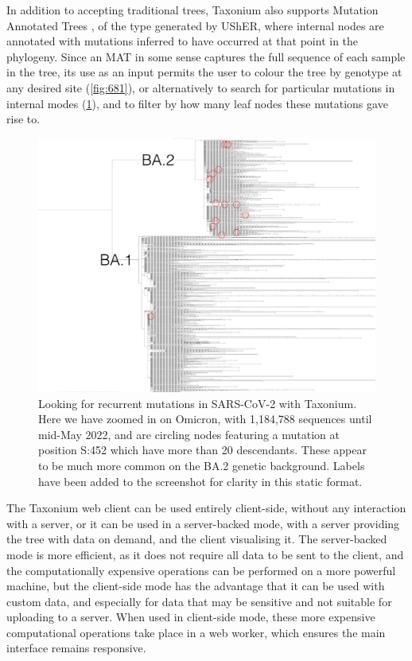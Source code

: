 In addition to accepting traditional trees, Taxonium also supports Mutation Annotated Trees \citep{matutils}, of the type generated by UShER, where internal nodes are annotated with mutations inferred to have occurred at that point in the phylogeny. Since an MAT in some sense captures the full sequence of each sample in the tree, its use as an input permits the user to colour the tree by genotype at any desired site (\cref{fig:681}), or alternatively to search for particular mutations in internal modes (\cref{fig:452}), and to filter by how many leaf nodes these mutations gave rise to.



\begin{figure}
\begin{center}
\includegraphics[width=\linewidth]{Figures/452.pdf}
\end{center}
\caption{Looking for recurrent mutations in SARS-CoV-2 with Taxonium. Here we have zoomed in on Omicron, with 1,184,788 sequences until mid-May 2022, and are circling nodes featuring a mutation at position S:452 which have more than 20 descendants. These appear to be much more common on the BA.2 genetic background. Labels have been added to the screenshot for clarity in this static format.}
\label{fig:452}
\end{figure}


The Taxonium web client can be used entirely client-side, without any interaction with a server, or it can be used in a server-backed mode, with a server providing the tree with data on demand, and the client visualising it. The server-backed mode is more efficient, as it does not require all data to be sent to the client, and the computationally expensive operations can be performed on a more powerful machine, but the client-side mode has the advantage that it can be used with custom data, and especially for data that may be sensitive and not suitable for uploading to a server. When used in client-side mode, these more expensive computational operations take place in a web worker, which ensures the main interface remains responsive.


